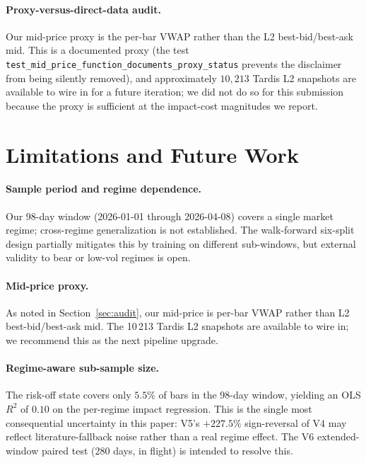 \documentclass[11pt,letterpaper]{article}
\begin{document}
\paragraph{Proxy-versus-direct-data audit.} Our mid-price proxy is the per-bar VWAP rather than the L2 best-bid/best-ask mid. This is a documented proxy (the test \texttt{test\_mid\_price\_function\_documents\_proxy\_status} prevents the disclaimer from being silently removed), and approximately \(10{,}213\) Tardis L2 snapshots are available to wire in for a future iteration; we did not do so for this submission because the proxy is sufficient at the impact-cost magnitudes we report.

\section{Limitations and Future Work}
\label{sec:limitations}

\paragraph{Sample period and regime dependence.} Our 98-day window (2026-01-01 through 2026-04-08) covers a single market regime; cross-regime generalization is not established. The walk-forward six-split design partially mitigates this by training on different sub-windows, but external validity to bear or low-vol regimes is open.

\paragraph{Mid-price proxy.} As noted in Section~\ref{sec:audit}, our mid-price is per-bar VWAP rather than L2 best-bid/best-ask mid. The 10\,213 Tardis L2 snapshots are available to wire in; we recommend this as the next pipeline upgrade.

\paragraph{Regime-aware sub-sample size.} The risk-off state covers only \(5.5\%\) of bars in the 98-day window, yielding an OLS \(R^{2}\) of \(0.10\) on the per-regime impact regression. This is the single most consequential uncertainty in this paper: V5's \(+227.5\%\) sign-reversal of V4 may reflect literature-fallback noise rather than a real regime effect. The V6 extended-window paired test (280 days, in flight) is intended to resolve this.
\end{document}

